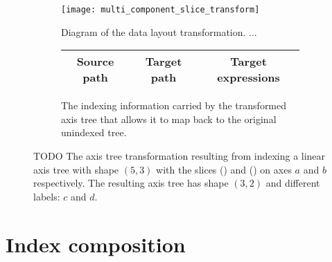 \documentclass[thesis]{subfiles}
\begin{document}
\begin{figure}[h]
  \centering
  \begin{subfigure}{\textwidth}
    \centering
    \texttt{[image: multi\_component\_slice\_transform]}
    \caption{
      Diagram of the data layout transformation.
      ...
    }
    \label{fig:multi_component_slice_transform_flowchart}
  \end{subfigure}

  \vspace{1em}

  \begin{subfigure}{\textwidth}
    \centering
    \begin{tabular}{|c|c|c|}
      \hline
      \textbf{Source path} & \textbf{Target path} & \textbf{Target expressions} \\
      \hline
      \hline
    \end{tabular}
    \caption{
      The indexing information carried by the transformed axis tree that allows it to map back to the original unindexed tree.
    }
    \label{fig:multi_component_slice_transform_exprs}
  \end{subfigure}

  \caption{
    TODO
    The axis tree transformation resulting from indexing a linear axis tree with shape $(5, 3)$ with the slices () and () on axes $a$ and $b$ respectively.
    The resulting axis tree has shape $(3, 2)$ and different labels: $c$ and $d$.
  }
  \label{fig:multi_component_slice_transform}
\end{figure}

\section{Index composition}
\label{sec:index_composition}
\end{document}
